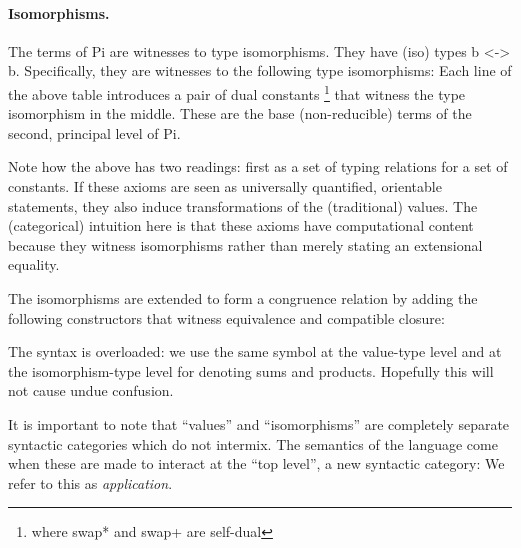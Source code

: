 \documentclass{llncs}
\begin{document}
\paragraph*{Isomorphisms.} The terms of {{Pi}} are witnesses to type
isomorphisms.  They have (iso) types {{b <-> b}}.  
Specifically, they are witnesses to the following type isomorphisms:
Each line of the above table introduces a pair of dual constants%
\footnote{where {{swap*}} and {{swap+}} are self-dual} that witness the type
isomorphism in the middle.  These are the base (non-reducible) terms of the
second, principal level of {{Pi}}.

Note how the above has two readings: first as a set of typing relations for a
set of constants. If these axioms are seen as universally quantified,
orientable statements, they also induce transformations of the (traditional)
values.  The (categorical) intuition here is that these axioms have
computational content because they witness isomorphisms rather than merely
stating an extensional equality.

The isomorphisms are extended to form a congruence relation by adding the
following constructors that witness equivalence and compatible closure:
%
%
%

The syntax is overloaded: we use the same symbol at the value-type level
and at the isomorphism-type level for denoting sums and products.  Hopefully
this will not cause undue confusion.

It is important to note that ``values'' and ``isomorphisms'' are 
completely separate syntactic categories which do not intermix.  The 
semantics of the language come when these are made to interact at
the ``top level'', a new syntactic category:
We refer to this as \emph{application}.
\end{document}
